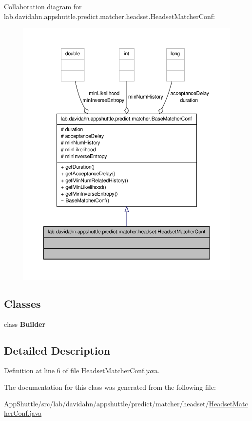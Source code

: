 \-Collaboration diagram for lab.\-davidahn.\-appshuttle.\-predict.\-matcher.\-headset.\-Headset\-Matcher\-Conf\-:
\nopagebreak
\begin{figure}[H]
\begin{center}
\leavevmode
\includegraphics[width=350pt]{classlab_1_1davidahn_1_1appshuttle_1_1predict_1_1matcher_1_1headset_1_1_headset_matcher_conf__coll__graph}
\end{center}
\end{figure}
\subsection*{\-Classes}
\begin{DoxyCompactItemize}
\item 
class {\bfseries \-Builder}
\end{DoxyCompactItemize}


\subsection{\-Detailed \-Description}


\-Definition at line 6 of file \-Headset\-Matcher\-Conf.\-java.



\-The documentation for this class was generated from the following file\-:\begin{DoxyCompactItemize}
\item 
\-App\-Shuttle/src/lab/davidahn/appshuttle/predict/matcher/headset/\hyperlink{_headset_matcher_conf_8java}{\-Headset\-Matcher\-Conf.\-java}\end{DoxyCompactItemize}
